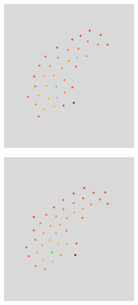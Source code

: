 \begin{figure}[H]
\begin{subfigure}[b]{1\linewidth}
\begin{subfigure}[b]{0.29\linewidth}
  	\caption{} 
  	\label{fig:ls_10_sweden2} 
  	\vspace{4ex}
  \end{subfigure}%
  \begin{subfigure}[b]{0.29\linewidth}
  	\centering
  	\includegraphics[width=0.9\linewidth]{Pictures/bp5_2_sweden} 
  	\caption{} 
  	\label{fig:bp5_2_sweden} 
  	\vspace{4ex}
  \end{subfigure}
  \begin{subfigure}[b]{0.29\linewidth}
  	\centering
  	\includegraphics[width=0.9\linewidth]{Pictures/bp10_2_sweden} 

\end{subfigure}
\end{subfigure}
\end{figure}

